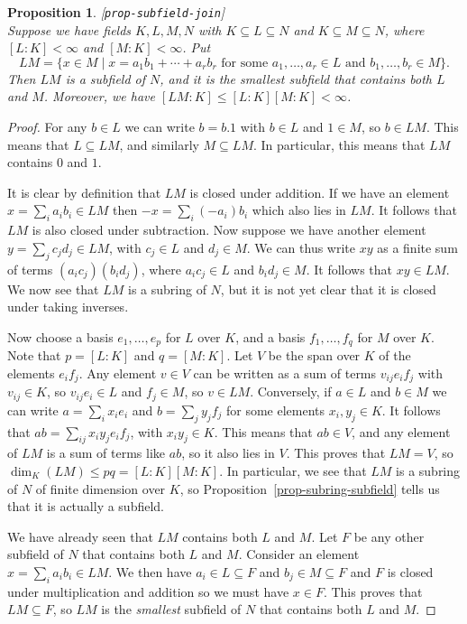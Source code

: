 \documentclass{amsart}
\newcommand{\lbl}[1]{\label{#1}\textup{[\texttt{#1}]}\ \\}
\newcommand{\lbl}{\label}
\newcommand{\st}        {\;|\;}
\newcommand{\sse}       {\subseteq}
\renewcommand{\:}{\colon}
\newtheorem{proposition}[theorem]{Proposition}
\theoremstyle{definition}
\begin{document}
\begin{proposition}\lbl{prop-subfield-join}
 Suppose we have fields $K,L,M,N$ with $K\sse L\sse N$ and
 $K\sse M\sse N$, where $[L:K]<\infty$ and $[M:K]<\infty$.  Put 
 \[ LM = \{x\in M\st 
     x = a_1b_1+\dotsb+a_rb_r \text{ for some }
     a_1,\dotsc,a_r\in L \text{ and } 
     b_1,\dotsc,b_r\in M\}.
 \] 
 Then $LM$ is a subfield of $N$, and it is the smallest subfield that
 contains both $L$ and $M$.  Moreover, we have
 $[LM:K]\leq[L:K][M:K]<\infty$. 
\end{proposition}
\begin{proof}
 For any $b\in L$ we can write $b=b.1$ with $b\in L$ and $1\in M$, so
 $b\in LM$.  This means that $L\sse LM$, and similarly $M\sse LM$.  In
 particular, this means that $LM$ contains $0$ and $1$.

 It is clear by definition that $LM$ is closed under addition.  If we
 have an element $x=\sum_ia_ib_i\in LM$ then $-x=\sum_i(-a_i)b_i$
 which also lies in $LM$.  It follows that $LM$ is also closed under
 subtraction.  Now suppose we have another element $y=\sum_jc_jd_j\in
 LM$, with $c_j\in L$ and $d_j\in M$.  We can thus write $xy$ as a
 finite sum of terms $(a_ic_j)(b_id_j)$, where $a_ic_j\in L$ and
 $b_id_j\in M$.  It follows that $xy\in LM$.  We now see that $LM$ is
 a subring of $N$, but it is not yet clear that it is closed under
 taking inverses.

 Now choose a basis $e_1,\dotsc,e_p$ for $L$ over $K$, and a basis
 $f_1,\dotsc,f_q$ for $M$ over $K$.  Note that $p=[L:K]$ and
 $q=[M:K]$.  Let $V$ be the span over $K$ of the elements $e_if_j$.
 Any element $v\in V$ can be written as a sum of terms $v_{ij}e_if_j$
 with $v_{ij}\in K$, so $v_{ij}e_i\in L$ and $f_j\in M$, so $v\in LM$.
 Conversely, if $a\in L$ and $b\in M$ we can write $a=\sum_ix_ie_i$
 and $b=\sum_jy_jf_j$ for some elements $x_i,y_j\in K$.  It follows
 that $ab=\sum_{ij}x_iy_je_if_j$, with $x_iy_j\in K$.  This means that
 $ab\in V$, and any element of $LM$ is a sum of terms like $ab$, so it
 also lies in $V$.  This proves that $LM=V$, so
 $\dim_K(LM)\leq pq=[L:K][M:K]$.  In particular, we see that $LM$ is a
 subring of $N$ of finite dimension over $K$, so
 Proposition~\ref{prop-subring-subfield} tells us that it is actually
 a subfield.

 We have already seen that $LM$ contains both $L$ and $M$.  Let $F$
 be any other subfield of $N$ that contains both $L$ and $M$.
 Consider an element $x=\sum_ia_ib_i\in LM$.  We then have
 $a_i\in L\sse F$ and $b_j\in M\sse F$ and $F$ is closed under
 multiplication and addition so we must have $x\in F$.  This proves
 that $LM\sse F$, so $LM$ is the \emph{smallest} subfield of $N$ that
 contains both $L$ and $M$.
\end{proof}
\end{document}
